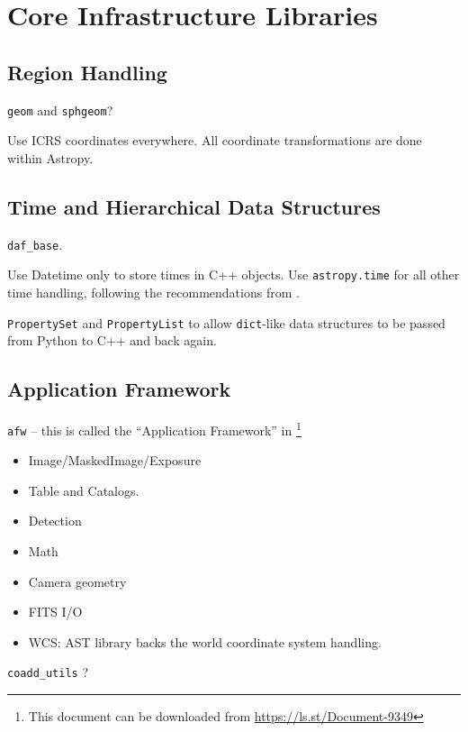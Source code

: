 \section{Core Infrastructure Libraries}
\label{sec:core}

\subsection{Region Handling}

\texttt{geom} and \texttt{sphgeom}?

Use ICRS coordinates everywhere.
All coordinate transformations are done within Astropy.

\subsection{Time and Hierarchical Data Structures}

\texttt{daf\_base}.

Use Datetime only to store times in C++ objects.
Use \texttt{astropy.time} for all other time handling, following the recommendations from \citet{2016SPIE.9913E..0GJ}.

\texttt{PropertySet} and \texttt{PropertyList} to allow \texttt{dict}-like data structures to be passed from Python to C++ and back again.

\subsection{Application Framework}
\label{sec:afw}
\texttt{afw} -- this is called the ``Application Framework'' in \citet{2010SPIE.7740E..15A}\footnote{This document can be downloaded from \url{https://ls.st/Document-9349}}

\begin{itemize}
\item Image/MaskedImage/Exposure
\item Table and Catalogs.
\item Detection
\item Math
\item Camera geometry
\item FITS I/O
\item WCS: AST library \citep{2016A&C....15...33B} backs the world coordinate system handling.
\end{itemize}

\texttt{coadd\_utils} ?
